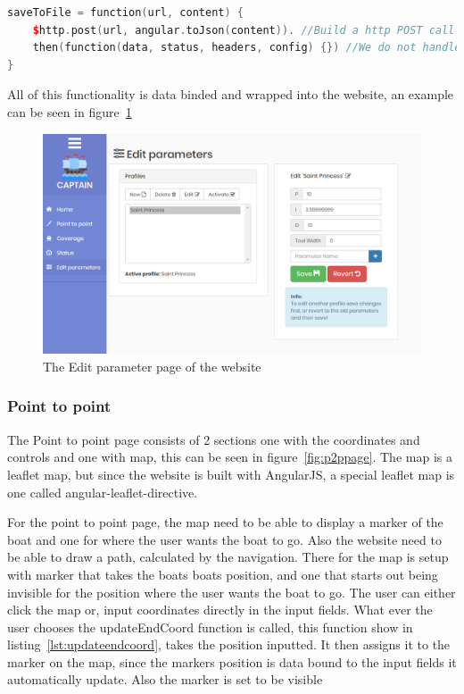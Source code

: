 \begin{lstlisting}[caption = {saveToFile function in editParam.js}, captionpos=b, label={lst:savetofile}, language=C++,firstnumber=1]
saveToFile = function(url, content) {
	$http.post(url, angular.toJson(content)). //Build a http POST call with the url and content
	then(function(data, status, headers, config) {}) //We do not handle errors atm.
}
\end{lstlisting}

All of this functionality is data binded and wrapped into the website, an example can be seen in figure~\ref{fig:editpage}

\begin{figure}[H]
\centering
\includegraphics[width=0.9\linewidth]{Images/Implementation/edit_page}
\caption{The Edit parameter page of the website}
\label{fig:editpage}
\end{figure}

\subsubsection{Point to point}

The Point to point page consists of 2 sections one with the coordinates and controls and one with map, this can be seen in figure~\ref{fig:p2ppage}. The map is a leaflet map, but since the website is built with AngularJS, a special leaflet map is one called angular-leaflet-directive\cite{leaflet}. 

For the point to point page, the map need to be able to display a marker of the boat and one for where the user wants the boat to go. Also the website need to be able to draw a path, calculated by the navigation. There for the map is setup with marker that takes the boats boats position, and one that starts out being invisible for the position where the user wants the boat to go. The user can either click the map or, input coordinates directly in the input fields. What ever the user chooses the updateEndCoord function is called, this function show in listing~\ref{lst:updateendcoord}, takes the position inputted. It then assigns it to the marker on the map, since the markers position is data bound to the input fields it automatically update. Also the marker is set to be visible 

